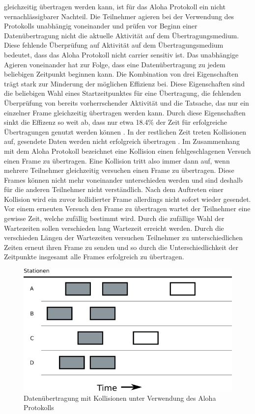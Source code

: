 gleichzeitig übertragen werden kann, ist für das Aloha Protokoll ein nicht vernachlässigbarer Nachteil. Die Teilnehmer agieren bei der Verwendung des Protokolls unabhängig voneinander und prüfen vor Beginn einer Datenübertragung nicht die aktuelle Aktivität auf dem Übertragungsmedium. Diese fehlende Überprüfung auf Aktivität auf dem Übertragungsmedium bedeutet, dass das Aloha Protokoll nicht carrier sensitiv ist. Das unabhängige Agieren voneinander hat zur Folge, dass eine Datenübertragung zu jedem beliebigen Zeitpunkt beginnen kann. Die Kombination von drei Eigenschaften trägt stark zur Minderung der möglichen Effizienz bei. Diese Eigenschaften sind die beliebigen Wahl eines Startzeitpunktes für eine Übertragung, die fehlenden Überprüfung von bereits vorherrschender Aktivität und die Tatsache, das nur ein einzelner Frame gleichzeitig übertragen werden kann. Durch diese Eigenschaften sinkt die Effizenz so weit ab, dass nur etwa 18.4\% der Zeit für erfolgreiche Übertragungen genutzt werden können \cite{Back_AlohaPure}. In der restlichen Zeit treten Kollisionen auf, gesendete Daten werden nicht erfolgreich übertragen \cite{Back_AlohaPure}. Im Zusammenhang mit dem Aloha Protokoll bezeichnet eine Kollision einen fehlgeschlagenen Versuch einen Frame zu übertragen. Eine Kollision tritt also immer dann auf, wenn mehrere Teilnehmer gleichzeitig versuchen einen Frame zu übertragen. Diese Frames können nicht mehr voneinander unterschieden werden und sind deshalb für die anderen Teilnehmer nicht verständlich. Nach dem Auftreten einer Kollision wird ein zuvor kollidierter Frame allerdings nicht sofort wieder gesendet. Vor einem erneuten Versuch den Frame zu übertragen wartet der Teilnehmer eine gewisse Zeit, welche zufällig bestimmt wird. Durch die zufällige Wahl der Wartezeiten sollen verschieden lang Wartezeit erreicht werden. Durch die verschieden Längen der Wartezeiten versuchen Teilnehmer zu unterschiedlichen Zeiten erneut ihren Frame zu senden und so durch die Unterschiedlichkeit der Zeitpunkte insgesamt alle Frames erfolgreich zu übertragen.
\begin{figure}[h!]
	\begin{center}
	\includegraphics[scale=0.6]{img/ZeichnungExport2.png}
	\caption{Datenübertragung mit Kollisionen unter Verwendung des Aloha Protokolls}
	\end{center}
	\label{Abb2_PureAloha}
\end{figure}


